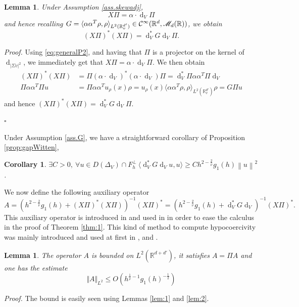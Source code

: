 \documentclass[12pt]{amsart}
\newcommand{\R}{\mathbb R}
\def\<{\langle}
\def\>{\rangle}
\newcommand{\bp}{{\it Proof. }}
\newcommand{\ep}{\hfill $\square$}
\renewcommand{\d}{\operatorname{d}}
\numberwithin{equation}{section}
\numberwithin{figure}{section}
\newcommand{\vvert}[1]{\left\lVert#1\right\rVert}
\newtheorem{corollary}[defin]{Corollary}
\newtheorem{lemma}[defin]{Lemma}
\def\Mr{{\mathscr M}}\def\Nr{{\mathscr N}}\def\Or{{\mathscr O}}\def\Pr{{\mathscr P}}
\begin{document}
\begin{lemma}\label{lem:XPi}
    Under Assumption \ref{ass.skewadj},
    \begin{equation}\label{eq:XPi}
    X\Pi = \alpha\cdot\d_V\Pi
    \end{equation}
    and hence recalling $G = \<\alpha\alpha^T\rho,\rho\>_{L^2(\R_v^{d'})} \in \ccc^\infty(\R^d,\Mr_d(\R))$, we obtain
    \begin{equation}\label{eq:XPistarXPi}
    (X\Pi)^*(X\Pi) = \d_V^*G\d_V\Pi.
    \end{equation}
\end{lemma}

\bp Using \eqref{eq:generalP2}, and having that $\Pi$ is a projector on the kernel of $\d_{|\Sigma v|^2}$, we immediately get that $X\Pi = \alpha\cdot\d_V\Pi$. We then obtain
\begin{equation*}
\begin{aligned}
    (X\Pi)^*(X\Pi) &= \Pi(\alpha\cdot\d_V)^*(\alpha\cdot\d_V)\Pi = \d_V^*\Pi\alpha\alpha^T\Pi\d_V\\
    \Pi\alpha\alpha^T\Pi u &= \Pi\alpha\alpha^Tu_\rho(x)\rho = u_\rho(x)\<\alpha\alpha^T\rho,\rho\>_{L^2(\R_v^{d'})}\rho = G\Pi u
\end{aligned}
\end{equation*}
and hence $(X\Pi)^*(X\Pi) = \d_V^*G\d_V\Pi$.

\ep

Under Assumption \ref{ass.G}, we have a straightforward corollary of Proposition \ref{prop:gapWitten},

\begin{corollary}\label{cor:lowbound}
    $\exists C>0,\ \forall u\in D(\Delta_V)\cap F_h^\bot\ \<\d_V^*G\d_Vu,u\> \geq Ch^{2-\frac2{\overline{\nu}}}g_1(h)\vvert{u}^2$.
\end{corollary}

We now define the following auxiliary operator
\begin{equation}\label{eq:A}
A = (h^{2-\frac2{\overline{\nu}}}g_1(h) + (X\Pi)^*(X\Pi))^{-1}(X\Pi)^* = (h^{2-\frac2{\overline{\nu}}}g_1(h) + \d_V^*G\d_V)^{-1}(X\Pi)^*.
\end{equation}
This auxiliary operator is introduced in \cite{DoMoSc15} and used in \cite{LeSaSt20} in order to ease the calculus in the proof of Theorem \ref{thm:1}. This kind of method to compute hypocoercivity was mainly introduced and used at first in \cite{Vi09}, \cite{HeNi04} and \cite{He06}.
\begin{lemma}\label{lem:Aborne}
The operator $A$ is bounded on $L^2(\R^{d+d'})$, it satisfies $A = \Pi A$ and one has the estimate
\begin{equation*}
\Vert A\Vert_{L^2}\leq O(h^{\frac1{\overline{\nu}}-1}g_1(h)^{-\frac12})
\end{equation*}
\end{lemma}
\bp The bound is easily seen using Lemmas \ref{lem:1} and \ref{lem:2}.
\end{document}
